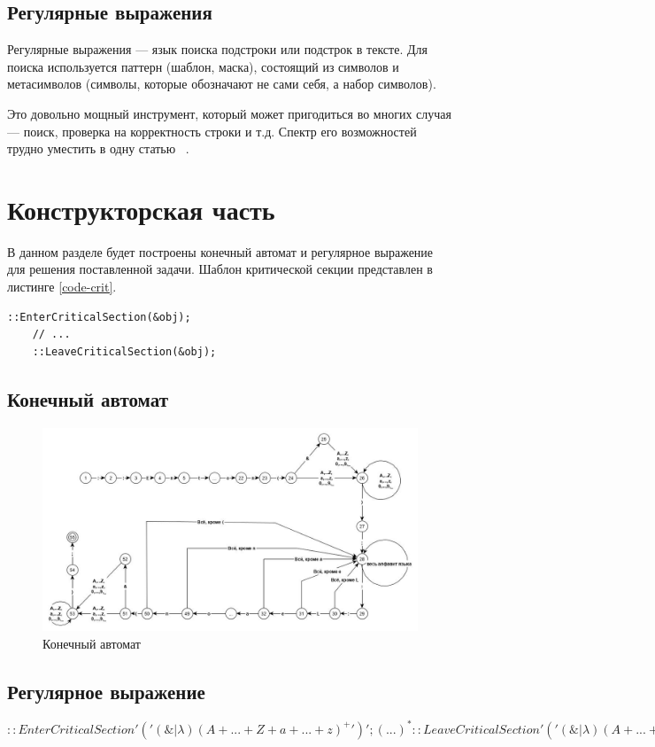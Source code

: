 \documentclass[12pt, a4paper]{report}
\begin{document}
	\section{Регулярные выражения}
	\hspace{0.5cm}Регулярные выражения — язык поиска подстроки или подстрок в тексте. Для поиска
	используется паттерн (шаблон, маска), состоящий из символов и метасимволов (символы,
	которые обозначают не сами себя, а набор символов).
	
	Это довольно мощный инструмент, который может пригодиться во многих случая —
	поиск, проверка на корректность строки и т.д. Спектр его возможностей трудно уместить
	в одну статью ~\cite{regexp}.
	
	\chapter{Конструкторская часть}
	\hspace{0.5cm}В данном разделе будет построены конечный автомат и регулярное выражение для решения поставленной задачи.
	Шаблон критической секции представлен в листинге \ref{code-crit}.
	\begin{lstlisting}[label=code-crit,caption=Шаблон критической секции]
	::EnterCriticalSection(&obj);
	// ...
	::LeaveCriticalSection(&obj);
	\end{lstlisting}
	
	\section{Конечный автомат}
	\begin{figure}[ht!]
		\centering
		\includegraphics[width=1\linewidth]{ka.jpg}
		\caption{Конечный автомат}
		\label{ris:ka}
	\end{figure}

	\section{Регулярное выражение}
	$::EnterCriticalSection'(' (\&|\lambda) (A+...+Z+a+...+z)^{+} ')';(...)^*
	::LeaveCriticalSection'(' (\&|\lambda) (A+...+Z+a+...+z)^{+} ')';$
\end{document}
